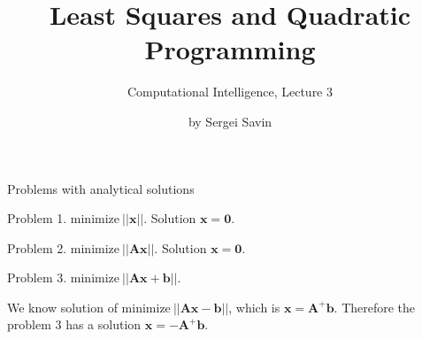 \documentclass{beamer}
\title{Least Squares and Quadratic Programming}
\subtitle{Computational Intelligence, Lecture 3}
\author{by Sergei Savin}
\date{\mydate}
\begin{document}
\maketitle


%
%



\begin{frame}{Problems with analytical solutions}
\begin{flushleft}

Problem 1. $\text{minimize} \ ||\mathbf{x}||$. Solution $\mathbf{x} = \mathbf{0}$.

\bigskip

Problem 2. $\text{minimize} \ ||\mathbf{A}\mathbf{x}||$. Solution $\mathbf{x} = \mathbf{0}$.

\bigskip

Problem 3. $\text{minimize} \ ||\mathbf{A}\mathbf{x} + \mathbf{b}||$. 

\bigskip

We know solution of $\text{minimize} \ ||\mathbf{A}\mathbf{x} - \mathbf{b}||$, which is $\mathbf{x} = \mathbf{A}^+ \mathbf{b}$. Therefore the problem 3 has a solution $\mathbf{x} = -\mathbf{A}^+ \mathbf{b}$.
 
\end{flushleft}
\end{frame}
\end{document}
